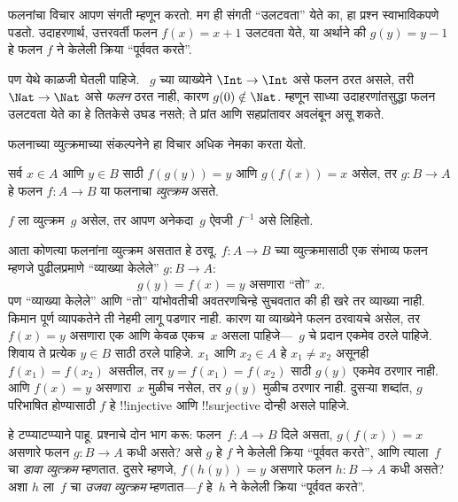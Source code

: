 \documentclass[../../../include/open-logic-section]{subfiles}
\begin{document}

\begin{explain}
फलनांचा विचार आपण संगती म्हणून करतो. मग ही संगती ``उलटवता'' येते का,
हा प्रश्न स्वाभाविकपणे पडतो. उदाहरणार्थ, उत्तरवर्ती फलन $f(x) = x + 1$
उलटवता येते, या अर्थाने की $g(y) = y - 1$ हे फलन $f$ ने केलेली
क्रिया ``पूर्ववत करते''.

पण येथे काळजी घेतली पाहिजे. ~$g$ च्या व्याख्येने $\Int \to \Int$
असे फलन ठरत असले, तरी $\Nat \to \Nat$ असे \emph{फलन} ठरत नाही,
कारण $g(0) \notin \Nat$. म्हणून साध्या उदाहरणांतसुद्धा फलन उलटवता
येते का हे तितकेसे उघड नसते; ते प्रांत आणि सहप्रांतावर अवलंबून असू शकते.

फलनाच्या व्युत्क्रमाच्या संकल्पनेने हा विचार अधिक नेमका करता येतो.
\end{explain}

\begin{defn}
सर्व $x \in A$ आणि $y \in B$ साठी $f(g(y)) = y$ आणि $g(f(x)) = x$
असेल, तर $g \colon B \to A$ हे फलन $f \colon A \to B$ या फलनाचा
\emph{व्युत्क्रम} असते.
\end{defn}

$f$ ला व्युत्क्रम~$g$ असेल, तर आपण अनेकदा~$g$ ऐवजी $f^{-1}$ असे लिहितो.

\begin{explain}
आता कोणत्या फलनांना व्युत्क्रम असतात हे ठरवू. $f\colon A \to B$
च्या व्युत्क्रमासाठी एक संभाव्य फलन म्हणजे पुढीलप्रमाणे ``व्याख्या केलेले''
$g\colon B \to A$:
\[
g(y) = \text{$f(x) = y$ असणारा ``तो'' $x$.}
\]
पण ``व्याख्या केलेले'' आणि ``तो'' यांभोवतीची अवतरणचिन्हे सुचवतात की
ही खरे तर व्याख्या नाही. किमान पूर्ण व्यापकतेने ती नेहमी लागू पडणार
नाही. कारण या व्याख्येने फलन ठरवायचे असेल, तर $f(x) = y$ असणारा
एक आणि केवळ एकच~$x$ असला पाहिजे---~$g$ चे प्रदान एकमेव ठरले पाहिजे.
शिवाय ते प्रत्येक $y \in B$ साठी ठरले पाहिजे. $x_1$ आणि $x_2 \in A$
हे $x_1 \neq x_2$ असूनही $f(x_1) = f(x_2)$ असतील, तर
$y = f(x_1) = f(x_2)$ साठी $g(y)$ एकमेव ठरणार नाही.
आणि $f(x) = y$ असणारा~$x$ मुळीच नसेल, तर $g(y)$ मुळीच ठरणार नाही.
दुसऱ्या शब्दांत, $g$ परिभाषित होण्यासाठी $f$ हे !!{injective} आणि
!!{surjective} दोन्ही असले पाहिजे.

हे टप्प्याटप्प्याने पाहू. प्रश्नाचे दोन भाग करू: फलन~$f\colon A \to B$
दिले असता, $g(f(x)) = x$ असणारे फलन $g\colon B \to A$ कधी असते?
असे $g$ हे $f$ ने केलेली क्रिया ``पूर्ववत करते'', आणि त्याला~$f$ चा
\emph{डावा व्युत्क्रम} म्हणतात. दुसरे म्हणजे, $f(h(y)) = y$ असणारे
फलन $h\colon B \to A$ कधी असते? अशा $h$ ला~$f$ चा
\emph{उजवा व्युत्क्रम} म्हणतात---$f$ हे~$h$ ने केलेली क्रिया ``पूर्ववत करते''.
\end{explain}
\end{document}
